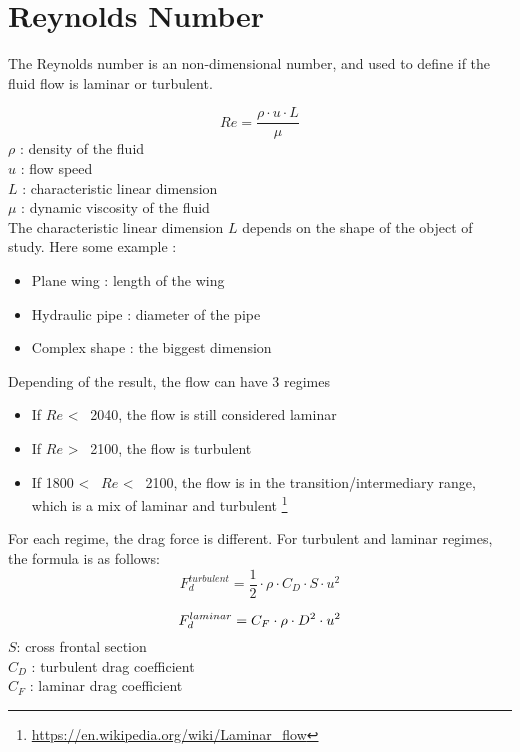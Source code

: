 \documentclass[12pt,a4paper]{article}
\begin{document}
\section{Reynolds Number}
The Reynolds number is an non-dimensional number, and used to define if the fluid flow is laminar or turbulent. 

\begin{equation}
	Re = \frac{\rho \cdot u \cdot L}{\mu}
\end{equation}
$\rho$ : density of the fluid\\
$u$ : flow speed\\
$L$ : characteristic linear dimension\\
$\mu$ : dynamic viscosity of the fluid\\

The characteristic linear dimension $L$ depends on the shape of the object of study. Here some example : 
\begin{itemize}
	\item Plane wing : length of the wing
	\item Hydraulic pipe : diameter of the pipe
	\item Complex shape : the biggest dimension
\end{itemize}
Depending of the result, the flow can have 3 regimes

\begin{itemize}
	\item If $Re$ <~ 2040, the flow is still considered laminar 
	\item If $Re$ >~ 2100, the flow is turbulent
	\item If 1800 <~ $Re$ <~ 2100, the flow is in the transition/intermediary range, which is a mix of laminar and turbulent \footnote{\url{https://en.wikipedia.org/wiki/Laminar_flow}}
\end{itemize}

For each regime, the drag force is different. 
For turbulent and laminar regimes, the formula is as follows:
\begin{equation}
	F_d^{turbulent} = \frac{1}{2} \cdot \rho \cdot C_D \cdot S \cdot u^2
\end{equation}

\begin{equation}
	F_d^{laminar} = C_F \cdot \rho \cdot  D^2 \cdot u^2\\
\end{equation}
$S$: cross frontal section\\
$C_D$ : turbulent drag coefficient\\
$C_F$ : laminar drag coefficient\\
\end{document}

